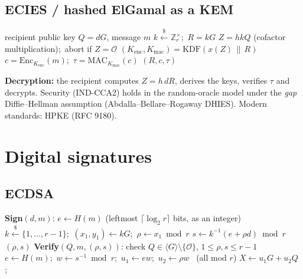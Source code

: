\documentclass[11pt,a4paper,oneside]{book}
\theoremstyle{plain}
\theoremstyle{definition}
\theoremstyle{remark}
\newcommand{\Z}{\mathbb{Z}}
\newcommand{\Oinf}{\mathcal{O}}
\newcommand{\sample}{\xleftarrow{\$}}
\begin{document}
\subsection{ECIES / hashed ElGamal as a KEM}

\begin{algorithm}[ht]
\caption{ECIES (KEM--DEM paradigm)}\label{alg:ecies}
\begin{algorithmic}[1]
\Require recipient public key $Q=dG$, message $m$
\State $k\sample\Z_r^\times$;\ $R=kG$ 
\State $Z=hkQ$ (cofactor multiplication);\ abort if $Z=\Oinf$
\State $(K_{\mathrm{enc}},K_{\mathrm{mac}})=\mathrm{KDF}(x(Z)\,\|\,R)$
\State $c=\mathrm{Enc}_{K_{\mathrm{enc}}}(m)$;\ $\tau=\mathrm{MAC}_{K_{\mathrm{mac}}}(c)$
\State \Return $(R,c,\tau)$
\end{algorithmic}
\end{algorithm}

\textbf{Decryption:} the recipient computes $Z=h\,dR$, derives the keys, verifies $\tau$ and decrypts. Security (IND-CCA2) holds in the random-oracle model under the \emph{gap} Diffie--Hellman assumption (Abdalla--Bellare--Rogaway DHIES). Modern standards: HPKE (RFC 9180).

\section{Digital signatures}

\subsection{ECDSA}

\begin{algorithm}[ht]
\caption{ECDSA}\label{alg:ecdsa}
\begin{algorithmic}[1]
\Statex \textbf{Sign}$(d,m)$:
\State $e\gets H(m)$ (leftmost $\lceil\log_2r\rceil$ bits, as an integer)
\Repeat
 \State $k\sample\{1,\dots,r-1\}$;\ $(x_1,y_1)\gets kG$;\ $\rho\gets x_1\bmod r$
 \State $s\gets k^{-1}(e+\rho d)\bmod r$
\State \Return $(\rho,s)$
\Statex \textbf{Verify}$(Q,m,(\rho,s))$:
\State check $Q\in\langle G\rangle\setminus\{\Oinf\}$, $1\le\rho,s\le r-1$
\State $e\gets H(m)$;\ $w\gets s^{-1}\bmod r$;\ $u_1\gets ew$;\ $u_2\gets\rho w$ \ (all mod $r$)
\State $X\gets u_1G+u_2Q$;\ \Return [$X\neq\Oinf$ and $x(X)\bmod r=\rho$]
\end{algorithmic}
\end{algorithm}
\end{document}
